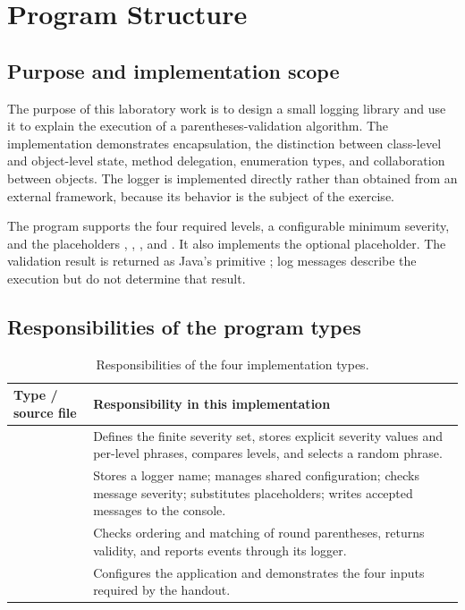 \section{Program Structure}
\subsection{Purpose and implementation scope}
The purpose of this laboratory work is to design a small logging library and use it to explain the execution of a parentheses-validation algorithm. The implementation demonstrates encapsulation, the distinction between class-level and object-level state, method delegation, enumeration types, and collaboration between objects. The logger is implemented directly rather than obtained from an external framework, because its behavior is the subject of the exercise.

The program supports the four required levels, a configurable minimum severity, and the placeholders , , , and . It also implements the optional  placeholder. The validation result is returned as Java's primitive ; log messages describe the execution but do not determine that result.

\subsection{Responsibilities of the program types}
\begin{table}[H]
\centering\small
\begin{tabularx}{\textwidth}{@{}p{}Y@{}}
\toprule
\textbf{Type / source file} & \textbf{Responsibility in this implementation}\\
\midrule
{} & Defines the finite severity set, stores explicit severity values and per-level phrases, compares levels, and selects a random phrase.\\
 & Stores a logger name; manages shared configuration; checks message severity; substitutes placeholders; writes accepted messages to the console.\\
 & Checks ordering and matching of round parentheses, returns validity, and reports events through its logger.\\
 & Configures the application and demonstrates the four inputs required by the handout.\\
\bottomrule
\end{tabularx}
\caption{Responsibilities of the four implementation types.}
\end{table}


